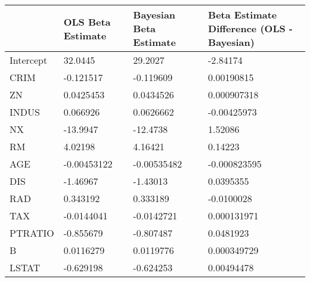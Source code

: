 \begin{tabular}{llll}
\hline
           & OLS Beta Estimate   & Bayesian Beta Estimate   & Beta Estimate Difference (OLS - Bayesian)   \\
\hline
 Intercept & 32.0445             & 29.2027                  & -2.84174                                    \\
 CRIM      & -0.121517           & -0.119609                & 0.00190815                                  \\
 ZN        & 0.0425453           & 0.0434526                & 0.000907318                                 \\
 INDUS     & 0.066926            & 0.0626662                & -0.00425973                                 \\
 NX        & -13.9947            & -12.4738                 & 1.52086                                     \\
 RM        & 4.02198             & 4.16421                  & 0.14223                                     \\
 AGE       & -0.00453122         & -0.00535482              & -0.000823595                                \\
 DIS       & -1.46967            & -1.43013                 & 0.0395355                                   \\
 RAD       & 0.343192            & 0.333189                 & -0.0100028                                  \\
 TAX       & -0.0144041          & -0.0142721               & 0.000131971                                 \\
 PTRATIO   & -0.855679           & -0.807487                & 0.0481923                                   \\
 B         & 0.0116279           & 0.0119776                & 0.000349729                                 \\
 LSTAT     & -0.629198           & -0.624253                & 0.00494478                                  \\
\hline
\end{tabular}